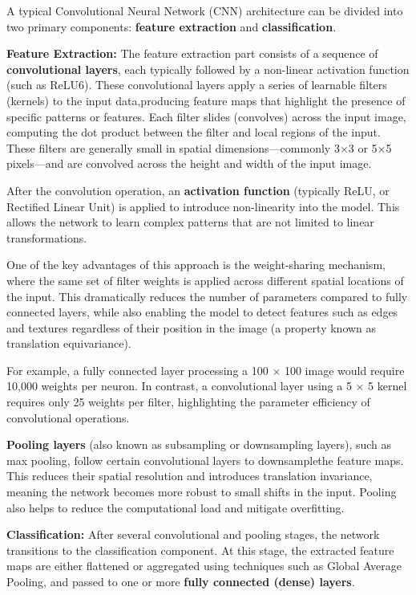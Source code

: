 A typical Convolutional Neural Network (CNN) architecture can be divided into two primary components: \textbf{feature extraction} and \textbf{classification}.

\textbf{Feature Extraction:}
\newline
The feature extraction part consists of a sequence of \textbf{convolutional layers}, each typically followed by a non-linear activation function (such as ReLU6). These convolutional layers apply a series of learnable filters (kernels) to the input data,producing feature maps that highlight the presence of specific patterns or features. Each filter slides (convolves) across the input image, computing the dot product between the filter and local regions of the input. These filters are generally small in spatial dimensions—commonly 3×3 or 5×5 pixels—and are convolved across the height and width of the input image.

After the convolution operation, an \textbf{activation function }(typically ReLU, or Rectified Linear Unit) is applied to introduce non-linearity into the model. This allows the network to learn complex patterns that are not limited to linear transformations.

One of the key advantages of this approach is the weight-sharing mechanism, where the same set of filter weights is applied across different spatial locations of the input. This dramatically reduces the number of parameters compared to fully connected layers, while also enabling the model to detect features such as edges and textures regardless of their position in the image (a property known as translation equivariance).

For example, a fully connected layer processing a 100 × 100 image would require 10,000 weights per neuron. In contrast, a convolutional layer using a 5 × 5 kernel requires only 25 weights per filter, highlighting the parameter efficiency of convolutional operations.

\textbf{Pooling layers} (also known as subsampling or downsampling layers), such as max pooling, follow certain convolutional layers to downsamplethe feature maps. This reduces their spatial resolution and introduces translation invariance, meaning the network becomes more robust to small shifts in the input. Pooling also helps to reduce the computational load and mitigate overfitting.

\textbf{Classification:}
\newline
After several convolutional and pooling stages, the network transitions to the classification component. At this stage, the extracted feature maps are either flattened or aggregated using techniques such as Global Average Pooling, and passed to one or more \textbf{fully connected (dense) layers}.

